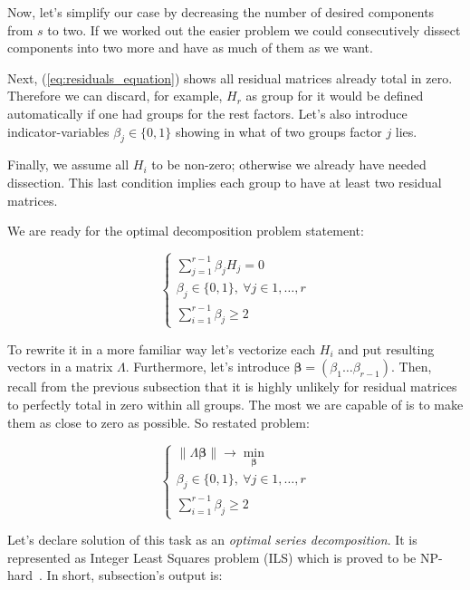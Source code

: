 \documentclass[referee, pdflatex, sn-mathphys-num]{sn-jnl}
\theoremstyle{definition}
\theoremstyle{plain}
\begin{document}
	Now, let's simplify our case by decreasing the number of desired components from $ s $ to two. If we worked out the easier problem we could consecutively dissect components into two more and have as much of them as we want.  
	
	Next, (\ref{eq:residuals_equation}) shows all residual matrices already total in zero. Therefore we can discard, for example, $ H_r $ as group for it would be defined automatically if one had groups for the rest factors. Let's also introduce indicator-variables $ \beta_j \in \{0, 1\} $ showing in what of two groups factor $ j $ lies.
	
	Finally, we assume all $ H_i $ to be non-zero; otherwise we already have needed dissection. This last condition implies each group to have at least two residual matrices.
	
	We are ready for the optimal decomposition problem statement:
	
	\begin{equation}
		\begin{cases*}
			\sum\limits_{j = 1}^{r - 1} \beta_j H_j = 0 \\
			\beta_j \in \{0, 1\}, \ \forall j \in 1, \ldots, r \\
			\sum\limits_{i = 1}^{r - 1} \beta_j \ge 2
		\end{cases*}
	\end{equation}
	
	To rewrite it in a more familiar way let's vectorize each $ H_i $ and put resulting vectors in a matrix $ \Lambda $. Furthermore, let's introduce $ \boldsymbol{\beta} = (\beta_1 \ldots \beta_{r-1}) $. Then, recall from the previous subsection that it is highly unlikely for residual matrices to perfectly total in zero within all groups. The most we are capable of is to make them as close to zero as possible. So restated problem:
	
	\begin{equation}\label{eq:decomp_search_final}
		\begin{cases*}
			\lVert \Lambda \boldsymbol{\beta} \rVert \to \underset{\boldsymbol{\beta}}{\min} \\
			\beta_j \in \{0, 1\}, \ \forall j \in 1, \ldots, r \\
			\sum\limits_{i = 1}^{r - 1} \beta_j \ge 2
		\end{cases*}
	\end{equation}
	
	Let's declare solution of this task as an \emph{optimal series decomposition}. It is represented as Integer Least Squares problem (ILS) which is proved to be NP-hard~\cite{van1981another}. In short, subsection's output is:
	
\end{document}
